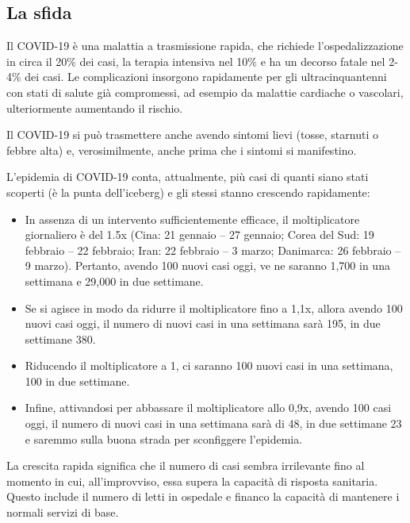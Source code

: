 \documentclass[onecolumn,journal]{IEEEtran}
\begin{document}
\begin{multicols}{2}

  \section*{La sfida}

  Il COVID-19 è una malattia a trasmissione rapida, che richiede l’ospedalizzazione in circa il 20\% dei casi, la terapia intensiva nel 10\% e ha un decorso fatale nel 2-4\% dei casi.
  Le complicazioni insorgono rapidamente per gli ultracinquantenni con stati di salute già compromessi, ad esempio da malattie cardiache o vascolari, ulteriormente aumentando il rischio.

  Il COVID-19 si può trasmettere anche avendo sintomi lievi (tosse, starnuti o febbre alta) e, verosimilmente, anche prima che i sintomi si manifestino.

  L’epidemia di COVID-19 conta, attualmente, più casi di quanti siano stati scoperti (è la punta dell’iceberg) e gli stessi stanno crescendo rapidamente:

\begin{itemize}

\item In assenza di un intervento sufficientemente efficace, il moltiplicatore
giornaliero è del 1.5x (Cina: 21 gennaio – 27 gennaio; Corea del Sud:
19 febbraio – 22 febbraio; Iran: 22 febbraio – 3 marzo; Danimarca:
26 febbraio – 9 marzo). Pertanto, avendo 100 nuovi casi oggi,
ve ne saranno 1,700 in una settimana e 29,000 in due settimane.

\item Se si agisce in modo da ridurre il moltiplicatore fino a 1,1x, allora avendo 100 nuovi casi oggi, il numero di nuovi casi in una settimana sarà 195, in due settimane 380.

\item  Riducendo il moltiplicatore a 1, ci saranno 100 nuovi casi in una settimana, 100 in due settimane.

\item  Infine, attivandosi per abbassare il moltiplicatore allo 0,9x, avendo 100 casi oggi, il numero di nuovi casi in una settimana sarà di 48, in due settimane 23 e saremmo sulla buona strada per sconfiggere l’epidemia.

\end{itemize}

  La crescita rapida significa che il numero di casi sembra irrilevante fino al momento in cui, all’improvviso, essa supera la capacità di risposta sanitaria. Questo include il numero di letti in ospedale e financo la capacità di mantenere i normali servizi di base.


\end{multicols}
\end{document}
